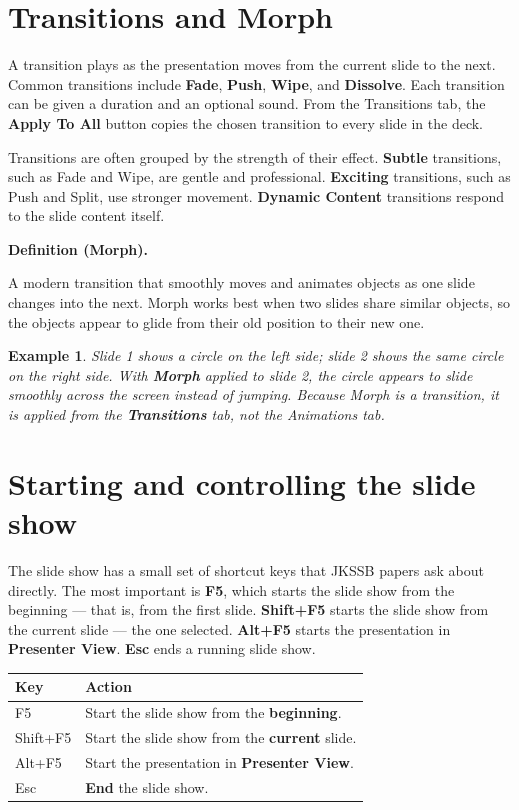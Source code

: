\documentclass[11pt]{article}
\newtheorem{example}{Example}[section]
\newenvironment{definitionbox}[1]{%
  \par\noindent\textbf{Definition (#1).}\ \itshape
}{\par\vspace{0.3em}}
\begin{document}
\section{Transitions and Morph}
A transition plays as the presentation moves from the current slide to the
next. Common transitions include \textbf{Fade}, \textbf{Push}, \textbf{Wipe},
and \textbf{Dissolve}. Each transition can be given a duration and an optional
sound. From the Transitions tab, the \textbf{Apply To All} button copies the
chosen transition to every slide in the deck.

Transitions are often grouped by the strength of their effect. \textbf{Subtle}
transitions, such as Fade and Wipe, are gentle and professional.
\textbf{Exciting} transitions, such as Push and Split, use stronger movement.
\textbf{Dynamic Content} transitions respond to the slide content itself.

\begin{definitionbox}{Morph}
A modern transition that smoothly moves and animates objects as one slide
changes into the next. Morph works best when two slides share similar objects,
so the objects appear to glide from their old position to their new one.
\end{definitionbox}

\begin{example}
Slide 1 shows a circle on the left side; slide 2 shows the same circle on the
right side. With \textbf{Morph} applied to slide 2, the circle appears to
slide smoothly across the screen instead of jumping. Because Morph is a
transition, it is applied from the \textbf{Transitions} tab, not the Animations
tab.
\end{example}

\section{Starting and controlling the slide show}
The slide show has a small set of shortcut keys that JKSSB papers ask about
directly. The most important is \textbf{F5}, which starts the slide show from
the beginning --- that is, from the first slide. \textbf{Shift+F5} starts the
slide show from the current slide --- the one selected. \textbf{Alt+F5} starts
the presentation in \textbf{Presenter View}. \textbf{Esc} ends a running slide
show.

\begin{center}
\begin{tabular}{p{}p{}}
\toprule
\textbf{Key} & \textbf{Action} \\
\midrule
F5 & Start the slide show from the \textbf{beginning}. \\
Shift+F5 & Start the slide show from the \textbf{current} slide. \\
Alt+F5 & Start the presentation in \textbf{Presenter View}. \\
Esc & \textbf{End} the slide show. \\
\bottomrule
\end{tabular}
\end{center}
\end{document}

